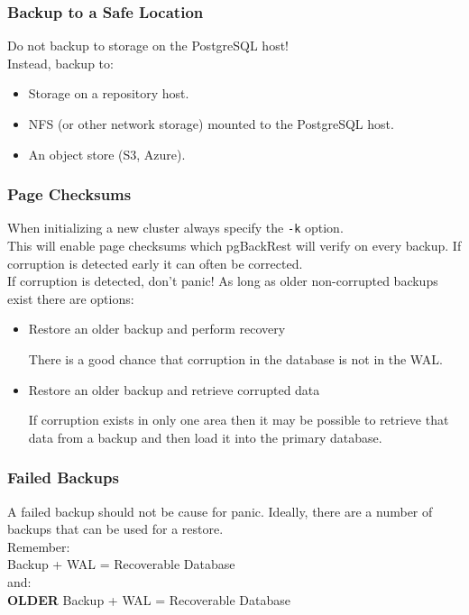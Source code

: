 \begin{frame}
    \frametitle{Backup to a Safe Location}

    Do not backup to storage on the PostgreSQL host!
    \\\vspace{1em}
    Instead, backup to:
    \begin{itemize}
        \item Storage on a repository host.
        \item NFS (or other network storage) mounted to the PostgreSQL host.
        \item An object store (S3, Azure).
    \end{itemize}
\end{frame}

\begin{frame}
    \frametitle{Page Checksums}

    When initializing a new cluster always specify the \texttt{-k} option.
    \\\vspace{1em}
    This will enable page checksums which pgBackRest will verify on every backup. If corruption is detected early it can often be corrected.
    \\\vspace{1em}
    If corruption is detected, don't panic! As long as older non-corrupted backups exist there are options:

    \begin{itemize}
        \item Restore an older backup and perform recovery

        There is a good chance that corruption in the database is not in the WAL.

        \item Restore an older backup and retrieve corrupted data

        If corruption exists in only one area then it may be possible to retrieve that data from a backup and then load it into the primary database.
    \end{itemize}
\end{frame}

\begin{frame}
    \frametitle{Failed Backups}

    A failed backup should not be cause for panic. Ideally, there are a number of backups that can be used for a restore.
    \\\vspace{1em}
    Remember:
    \\\vspace{1em}
    Backup + WAL = Recoverable Database
    \\\vspace{1em}
    and:
    \\\vspace{1em}
    \textbf{OLDER} Backup + WAL = Recoverable Database
\end{frame}

